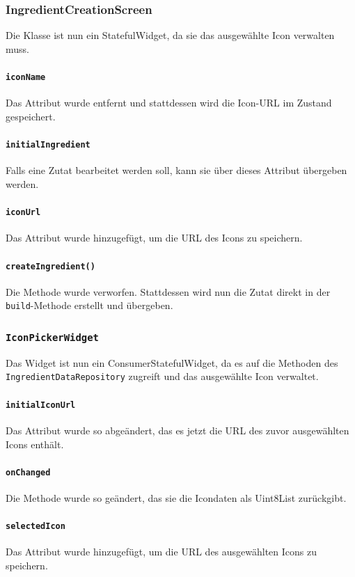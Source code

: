 \documentclass{implementierungsheft}
\begin{document}
\subsubsection*{IngredientCreationScreen}
Die Klasse ist nun ein StatefulWidget, da sie das ausgewählte Icon verwalten muss.
\paragraph{\texttt{iconName}}
Das Attribut wurde entfernt und stattdessen wird die Icon-URL im Zustand gespeichert.
\paragraph*{\texttt{initialIngredient}}
Falls eine Zutat bearbeitet werden soll, kann sie über dieses Attribut übergeben werden.
\paragraph{\texttt{iconUrl}}
Das Attribut wurde hinzugefügt, um die URL des Icons zu speichern.
\paragraph{\texttt{createIngredient()}}
Die Methode wurde verworfen. Stattdessen wird nun die Zutat direkt in der \texttt{build}-Methode erstellt und übergeben.
\subsubsection*{\texttt{IconPickerWidget}}
Das Widget ist nun ein ConsumerStatefulWidget, da es auf die Methoden des \texttt{IngredientData\-Repository} zugreift und das ausgewählte Icon verwaltet.
\paragraph{\texttt{initialIconUrl}} Das Attribut wurde so abgeändert, das es jetzt die URL des zuvor ausgewählten Icons enthält.
\paragraph{\texttt{onChanged}} Die Methode wurde so geändert, das sie die Icondaten als Uint8List zurückgibt.
\paragraph{\texttt{selectedIcon}} Das Attribut wurde hinzugefügt, um die URL des ausgewählten Icons zu speichern.
\end{document}

